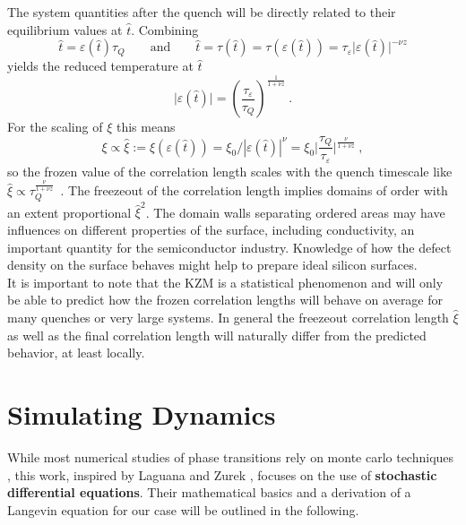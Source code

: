 	The system quantities after the quench will be directly related to their equilibrium values at $\hat{t}$. Combining
	\begin{equation}
		\hat{t} =	\varepsilon(\hat{t}) \tau_Q \qquad \text{and} \qquad  \hat{t} =	\tau(\hat{t}) = \tau(\varepsilon(\hat{t})) =	\tau_\varepsilon \big | \varepsilon(\hat{t}) \big |^{-\nu z}
	\end{equation}
	yields the reduced temperature at $\hat{t}$
	\begin{equation}
		\big|\varepsilon (\hat{t}) \big| =	\left(\frac{\tau_\varepsilon}{\tau_Q} \right)^{\frac{1}{1 + \nu z}} ~.
	\end{equation}
	For the scaling of $\xi$ this means
	\begin{equation} \label{Eq::KZM-scaling}
		\xi \propto \hat{\xi} := \xi(\varepsilon(\hat{t})) =	\xi_0 / |\varepsilon(\hat{t})|^{\nu} =	\xi_0 \bigg| \frac{\tau_Q}{\tau_\varepsilon} \bigg |^{\frac{\nu}{1 + \nu z}} ~,
	\end{equation}
	so the frozen value of the correlation length scales with the quench timescale like $\hat{\xi} \propto \tau_Q^{\frac{\nu}{1 + \nu z}}$~.
	The freezeout of the correlation length implies domains of order with an extent proportional $\hat{\xi}^2$. The domain walls separating ordered areas may have influences on different properties of the surface, including conductivity, an important quantity for the semiconductor industry. Knowledge of how the defect density on the surface behaves might help to prepare ideal silicon surfaces. \\
	
	It is important to note that the KZM is a statistical phenomenon and will only be able to predict how the frozen correlation lengths will behave on average for many quenches or very large systems. In general the freezeout correlation length $\hat{\xi}$ as well as the final correlation length will naturally differ from the predicted behavior, at least locally.
	\chapter{Simulating Dynamics} \label{Chapter::Simulating-Dynamics}
	While most numerical studies of phase transitions rely on monte carlo techniques \cite{rastelli2004monte, ferrenberg1991critical, hasenbusch2005two}, this work, inspired by Laguana and Zurek \cite{laguna1997density}, focuses on the use of \textbf{stochastic differential equations}. Their mathematical basics and a derivation of a Langevin equation for our case  will be outlined in the following.
